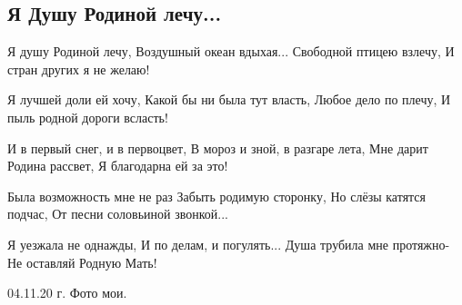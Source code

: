  
 
 

\subsection{Я Душу Родиной лечу...}
\label{sec:04_11_2020.fb.taisia_vakulenko.1.rodina}

Я душу Родиной лечу,
Воздушный океан вдыхая...
Свободной птицею взлечу,
И стран других я не желаю!

Я лучшей доли ей хочу,
Какой бы ни была тут власть,
Любое дело по плечу,
И пыль родной дороги всласть!

И в первый снег, и в первоцвет,
В мороз и зной, в разгаре лета,
Мне дарит Родина рассвет,
Я благодарна ей за это!

Была возможность мне не раз
Забыть родимую сторонку,
Но слёзы катятся подчас,
От песни соловьиной звонкой...

Я уезжала не однажды,
И по делам, и погулять...
Душа трубила мне протяжно-
Не оставляй Родную Мать!
 
04.11.20 г.
Фото мои.
